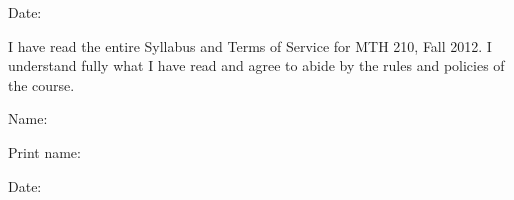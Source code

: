 \documentclass[12pt]{article}
\begin{document}
Date: \underline{\hspace{3in}}


\vspace{0.5in}

I have read the entire Syllabus and Terms of Service for MTH 210, Fall 2012. I understand fully what I have read and agree to abide by the rules and policies of the course. 

\bigskip

Name: \underline{\hspace{3in}}
\medskip

Print name: \underline{\hspace{3in}}
\medskip

Date: \underline{\hspace{3in}}
\end{document}
